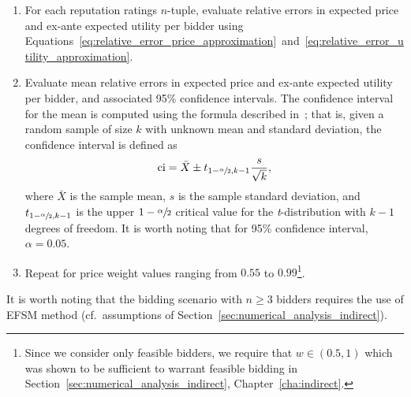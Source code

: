 \begin{enumerate}
\item For each reputation ratings $n$-tuple, evaluate relative errors in expected price and ex-ante expected utility per bidder using Equations~\eqref{eq:relative_error_price_approximation}~and~\eqref{eq:relative_error_utility_approximation}.
\item Evaluate mean relative errors in expected price and ex-ante expected utility per bidder, and associated 95\% confidence intervals. The confidence interval for the mean is computed using the formula described in~\cite{LawChapter42007}; that is, given a random sample of size $k$ with unknown mean and standard deviation, the confidence interval is defined as
\begin{equation*}
  \text{ci}=\bar{X}\pm t_{1-\sfrac{\alpha}{2},k-1}\frac{s}{\sqrt{k}},
\end{equation*}
where $\bar{X}$ is the sample mean, $s$ is the sample standard deviation, and $t_{1-\sfrac{\alpha}{2}, k-1}$ is the upper $1-\sfrac{\alpha}{2}$ critical value for the \emph{t}-distribution with $k-1$ degrees of freedom. It is worth noting that for 95\% confidence interval, $\alpha=0.05$.
\item Repeat for price weight values ranging from $0.55$ to $0.99$\footnote{Since we consider only feasible bidders, we require that $w\in(0.5,1)$ which was shown to be sufficient to warrant feasible bidding in Section~\ref{sec:numerical_analysis_indirect}, Chapter~\ref{cha:indirect}.}.
\end{enumerate}
It is worth noting that the bidding scenario with $n\geq 3$ bidders requires the use of EFSM method (cf.~assumptions of Section~\ref{sec:numerical_analysis_indirect}).

